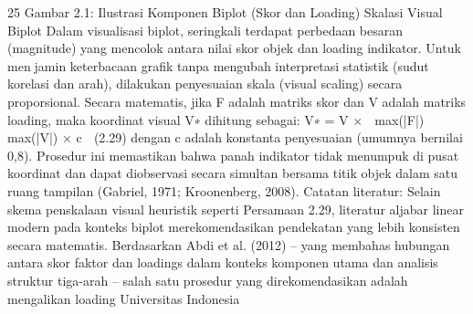 25
Gambar 2.1: Ilustrasi Komponen Biplot (Skor dan Loading)
Skalasi Visual Biplot Dalam visualisasi biplot, seringkali terdapat perbedaan besaran
(magnitude) yang mencolok antara nilai skor objek dan loading indikator. Untuk menjamin keterbacaan grafik tanpa mengubah interpretasi statistik (sudut korelasi dan arah),
dilakukan penyesuaian skala (visual scaling) secara proporsional. Secara matematis, jika
F adalah matriks skor dan V adalah matriks loading, maka koordinat visual V∗ dihitung
sebagai:
V∗ = V ×

max(|F|)
max(|V|)
× c

(2.29)
dengan c adalah konstanta penyesuaian (umumnya bernilai 0,8). Prosedur ini memastikan
bahwa panah indikator tidak menumpuk di pusat koordinat dan dapat diobservasi secara
simultan bersama titik objek dalam satu ruang tampilan (Gabriel, 1971; Kroonenberg,
2008).
Catatan literatur: Selain skema penskalaan visual heuristik seperti Persamaan 2.29,
literatur aljabar linear modern pada konteks biplot merekomendasikan pendekatan yang
lebih konsisten secara matematis. Berdasarkan Abdi et al. (2012) – yang membahas
hubungan antara skor faktor dan loadings dalam konteks komponen utama dan analisis
struktur tiga-arah – salah satu prosedur yang direkomendasikan adalah mengalikan loading
Universitas Indonesia

